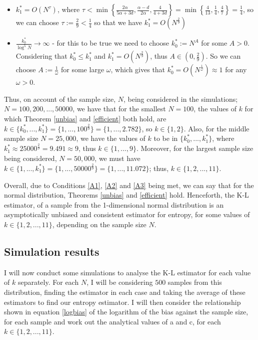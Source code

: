\documentclass[12pt]{report}
\begin{document}
\begin{itemize}
\item $k_{1}^{*} = O(N^{\tau})$, where $\tau < \min \left\{ \frac{2 \alpha}{5 \alpha + 3d} , \frac{\alpha - d}{2 \alpha} , \frac{4}{4 + 3d} \right\} = \min \left\{ \frac{4}{13}, \frac{1}{4}, \frac{4}{7} \right\} = \frac{1}{4}$, so we can choose $\tau := \frac{2}{9} < \frac{1}{4}$ so that we have $k_{1}^{*} = O(N^{\frac{2}{9}})$

\item $\frac{k_{0}^{*}}{\log^{5}{N}} \to \infty$ - for this to be true we need to choose $k_{0}^{*} := N^A$ for some $A>0$. Considering that $k_{0}^{*} \leq k_{1}^{*}$ and $ k_{1}^{*} = O(N^{\frac{2}{9}})$, thus $A \in (0, \frac{2}{9})$. So we can choose $A := \frac{1}{\omega}$ for some large $\omega$, which gives that $k_{0}^{*} = O(N^{\frac{1}{\omega}}) \approx 1$ for any $\omega >0$.
\end{itemize}

Thus, on account of the sample size, $N$, being considered in the simulations; $N=100, 200, ..., 50000$, we have that for the smallest $N=100$, the values of $k$ for which Theorem \ref{unbias} and \ref{efficient} both hold, are $k \in \{k_{0}^{*}, ..., k_{1}^{*} \} = \{1, ... , 100^{\frac{2}{9}}\} = \{1, ..., 2.782\}$, so $k \in \{1, 2\}$. Also, for the middle sample size $N=25,000$, we have the values of $k$ to be in $\{k_{0}^{*}, ..., k_{1}^{*} \}$, where $ k_{1}^{*} \approx 25000^{\frac{2}{9}} = 9.491 \approx 9$, thus $k \in \{ 1, ..., 9\}$. Moreover, for the largest sample size being considered, $N=50,000$, we must have $k \in \{1, ..., k_{1}^{*} \} = \{1, ... , 50000^{\frac{2}{9}}\} = \{1, ..., 11.072\}$; thus, $k \in \{1, 2, ..., 11\}$.

Overall, due to Conditions \ref{A1}, \ref{A2} and \ref{A3} being met, we can say that for the normal distribution, Theorems \ref{unbias} and \ref{efficient} hold. Henceforth, the K-L estimator, of a sample from the 1-dimensional normal distribution is an asymptotically unbiased and consistent estimator for entropy, for some values of $k \in \{1, 2, ..., 11\}$, depending on the sample size $N$. 


\subsection{Simulation results} \label{Normal_results}

I will now conduct some simulations to analyse the K-L estimator for each value of $k$ separately. For each $N$, I will be considering $500$ samples from this distribution, finding the estimator in each case and taking the average of these estimators to find our entropy estimator. I will then consider the relationship shown in equation \ref{logbias} of the logarithm of the bias against the sample size, for each sample and work out the analytical values of a and c, for each $k \in \{1, 2, ..., 11\}$. 
\end{document}
